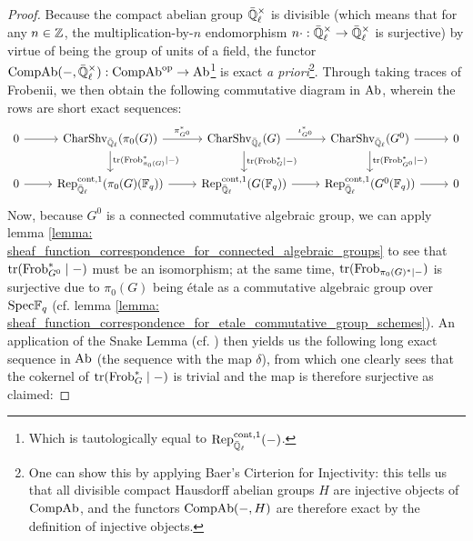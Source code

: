                 \begin{proof}
                    Because the compact abelian group $\bar{\Q}_{\ell}^{\x}$ is divisible (which means that for any $n \in \mathbb{Z}$, the multiplication-by-$n$ endomorphism $n \cdot: \bar{\Q}_{\ell}^{\x} \to \bar{\Q}_{\ell}^{\x}$ is surjective) by virtue of being the group of units of a field, the functor $\Comp\Ab(-, \bar{\Q}_{\ell}^{\x}): \Comp\Ab^{\op} \to \Ab$\footnote{Which is tautologically equal to $\mathrm{Rep}^{\mathrm{cont}, 1}_{\bar{\mathbb{Q}}_{\ell}}(-)$.} is exact \textit{a priori}\footnote{One can show this by applying Baer's Cirterion for Injectivity: this tells us that all divisible compact Hausdorff abelian groups $H$ are injective objects of $\mathrm{Comp}\mathrm{Ab}$, and the functors $\mathrm{Comp}\mathrm{Ab}(-, H)$ are therefore exact by the definition of injective objects.}. Through taking traces of Frobenii, we then obtain the following commutative diagram in $\mathrm{Ab}$, wherein the rows are short exact sequences:
                        $$
                            \begin{tikzcd}
                            	0 & {\Char\Shv_{\bar{\Q}_{\ell}}(\pi_0(G))} & {\Char\Shv_{\bar{\Q}_{\ell}}(G)} & {\Char\Shv_{\bar{\Q}_{\ell}}(G^0)} & 0 \\
                            	0 & {\Rep^{\cont, 1}_{\bar{\Q}_{\ell}}(\pi_0(G)(\F_q))} & {\Rep^{\cont, 1}_{\bar{\Q}_{\ell}}(G(\F_q))} & {\Rep^{\cont, 1}_{\bar{\Q}_{\ell}}(G^0(\F_q))} & 0
                            	\arrow[from=1-1, to=1-2]
                            	\arrow["{\pi_{G^0}^*}", from=1-2, to=1-3]
                            	\arrow["{\iota_{G^0}^*}", from=1-3, to=1-4]
                            	\arrow[from=1-4, to=1-5]
                            	\arrow[from=2-1, to=2-2]
                            	\arrow[from=2-2, to=2-3]
                            	\arrow[from=2-3, to=2-4]
                            	\arrow[from=2-4, to=2-5]
                            	\arrow["{\trace(\Frob_{\pi_0(G)}^* \mid -)}", from=1-2, to=2-2]
                            	\arrow["{\trace(\Frob_G^* \mid -)}", from=1-3, to=2-3]
                            	\arrow["{\trace(\Frob_{G^0}^* \mid -)}", from=1-4, to=2-4]
                            \end{tikzcd}
                        $$
                    Now, because $G^0$ is a connected commutative algebraic group, we can apply lemma \ref{lemma: sheaf_function_correspondence_for_connected_algebraic_groups} to see that $\operatorname{tr}(\mathrm{Frob}_{G^0}^* \mid -)$ must be an isomorphism; at the same time, $\operatorname{tr}(\mathrm{Frob}_{\pi_0(G)^* \mid -})$ is surjective due to $\pi_0(G)$ being \'etale as a commutative algebraic group over $\mathrm{Spec} \mathbb{F}_q$ (cf. lemma \ref{lemma: sheaf_function_correspondence_for_etale_commutative_group_schemes}). An application of the Snake Lemma (cf. \cite[\href{https://stacks.math.columbia.edu/tag/07JV}{Tag 07JV}]{stacks}) then yields us the following long exact sequence in $\mathrm{Ab}$ (the sequence with the map $\delta$), from which one clearly sees that the cokernel of $\operatorname{tr}(\mathrm{Frob}_G^* \mid -)$ is trivial and the map is therefore surjective as claimed:

\end{proof}
